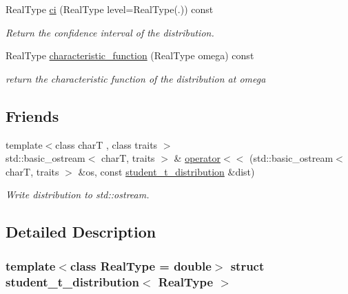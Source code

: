 \begin{DoxyCompactItemize}
\mbox{\label{structstudent__t__distribution_acd9350d5f25a95f8120333237f810f6b}} 
Real\+Type \mbox{\hyperlink{structstudent__t__distribution_acd9350d5f25a95f8120333237f810f6b}{ci}} (Real\+Type level=Real\+Type(.)) const
\begin{DoxyCompactList}\small\item\em Return the confidence interval of the distribution. \end{DoxyCompactList}\item 
\mbox{\label{structstudent__t__distribution_a16dd6f257065331e72960fb23c9c208e}} 
Real\+Type \mbox{\hyperlink{structstudent__t__distribution_a16dd6f257065331e72960fb23c9c208e}{characteristic\+\_\+function}} (Real\+Type omega) const
\begin{DoxyCompactList}\small\item\em return the characteristic function of the distribution at omega \end{DoxyCompactList}\end{DoxyCompactItemize}
\subsection*{Friends}
\begin{DoxyCompactItemize}
\item 
\mbox{\label{structstudent__t__distribution_aee4aaa9b82b8248166aced167a23798c}} 
{\footnotesize template$<$class charT , class traits $>$ }\\std\+::basic\+\_\+ostream$<$ charT, traits $>$ \& \mbox{\hyperlink{structstudent__t__distribution_aee4aaa9b82b8248166aced167a23798c}{operator$<$$<$}} (std\+::basic\+\_\+ostream$<$ charT, traits $>$ \&os, const \mbox{\hyperlink{structstudent__t__distribution}{student\+\_\+t\+\_\+distribution}} \&dist)
\begin{DoxyCompactList}\small\item\em Write distribution to std\+::ostream. \end{DoxyCompactList}\end{DoxyCompactItemize}


\subsection{Detailed Description}
\subsubsection*{template$<$class Real\+Type = double$>$\newline
struct student\+\_\+t\+\_\+distribution$<$ Real\+Type $>$}

